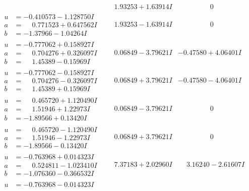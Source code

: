 \documentclass[1p]{elsarticle_modified}
\theoremstyle{definition}
\begin{document}
$$\begin{array}{c|c|c}
 & \phantom{-}1.93253 + 1.63914 I & \phantom{-0.000000 } 0 \\ \hline\begin{aligned}
u &= -0.410573 - 1.128750 I \\
a &= \phantom{-}0.771523 + 0.647562 I \\
b &= -1.37966 - 1.04264 I\end{aligned}
 & \phantom{-}1.93253 - 1.63914 I & \phantom{-0.000000 } 0 \\ \hline\begin{aligned}
u &= -0.777062 + 0.158927 I \\
a &= \phantom{-}0.704276 + 0.326097 I \\
b &= \phantom{-}1.45389 - 0.15969 I\end{aligned}
 & \phantom{-}0.06849 - 3.79621 I & -0.47580 + 4.06401 I \\ \hline\begin{aligned}
u &= -0.777062 - 0.158927 I \\
a &= \phantom{-}0.704276 - 0.326097 I \\
b &= \phantom{-}1.45389 + 0.15969 I\end{aligned}
 & \phantom{-}0.06849 + 3.79621 I & -0.47580 - 4.06401 I \\ \hline\begin{aligned}
u &= \phantom{-}0.465720 + 1.120490 I \\
a &= \phantom{-}1.51946 + 1.22973 I \\
b &= -1.89566 + 0.13420 I\end{aligned}
 & \phantom{-}0.06849 - 3.79621 I & \phantom{-0.000000 } 0 \\ \hline\begin{aligned}
u &= \phantom{-}0.465720 - 1.120490 I \\
a &= \phantom{-}1.51946 - 1.22973 I \\
b &= -1.89566 - 0.13420 I\end{aligned}
 & \phantom{-}0.06849 + 3.79621 I & \phantom{-0.000000 } 0 \\ \hline\begin{aligned}
u &= -0.763968 + 0.014323 I \\
a &= \phantom{-}0.524811 - 1.023410 I \\
b &= -1.076360 - 0.366532 I\end{aligned}
 & \phantom{-}7.37183 + 2.02960 I & \phantom{-}3.16240 - 2.61607 I \\ \hline\begin{aligned}
u &= -0.763968 - 0.014323 I \\

\end{aligned}
\end{array}$$
\end{document}
